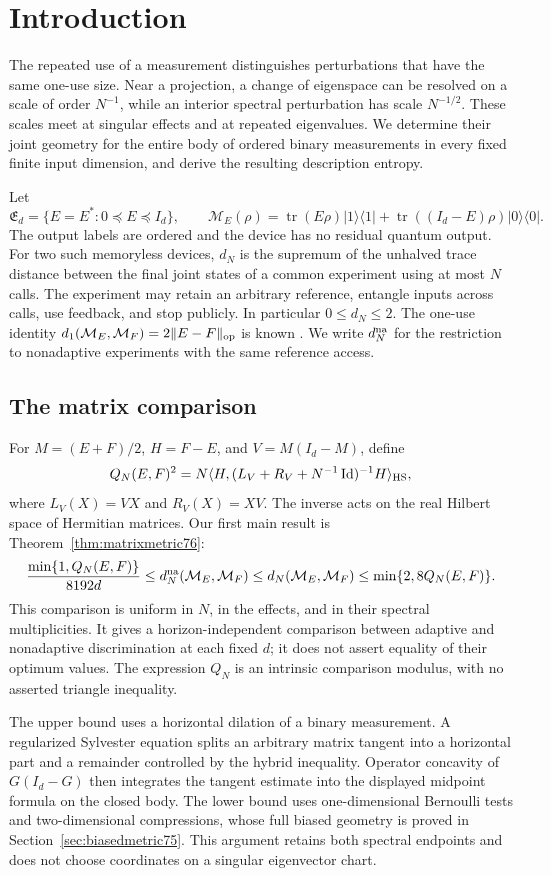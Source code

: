 \section{Introduction}
The repeated use of a measurement distinguishes perturbations that have
the same one-use size. Near a projection, a change of eigenspace can be
resolved on a scale of order $N^{-1}$, while an interior spectral
perturbation has scale $N^{-1/2}$. These scales meet at singular effects
and at repeated eigenvalues. We determine their joint geometry for the
entire body of ordered binary measurements in every fixed finite input
dimension, and derive the resulting description entropy.

Let
\[
 \mathfrak E_d=\{E=E^*:0\preceq E\preceq I_d\},\qquad
 \mathcal M_E(\rho)=\operatorname{tr}(E\rho)|1\rangle\langle1|
       +\operatorname{tr}((I_d-E)\rho)|0\rangle\langle0|.
\]
The output labels are ordered and the device has no residual quantum
output. For two such memoryless devices, $d_N$ is the supremum of the
unhalved trace distance between the final joint states of a common
experiment using at most $N$ calls. The experiment may retain an
arbitrary reference, entangle inputs across calls, use feedback, and
stop publicly. In particular $0\le d_N\le2$. The one-use identity
$d_1(\mathcal M_E,\mathcal M_F)=2\|E-F\|_{\rm op}$ is known
\cite[Lemmas III.7--III.8]{MB67}. We write $d_N^{\rm na}$ for the
restriction to nonadaptive experiments with the same reference access.

\subsection{The matrix comparison}
For $M=(E+F)/2$, $H=F-E$, and $V=M(I_d-M)$, define
\[
 Q_N(E,F)^2
   =N\langle H,(L_V+R_V+N^{-1}\operatorname{Id})^{-1}H
                      \rangle_{\rm HS},
\]
where $L_V(X)=VX$ and $R_V(X)=XV$. The inverse acts on the real
Hilbert space of Hermitian matrices. Our first main result is
Theorem~\ref{thm:matrixmetric76}:
\[
 \frac{\min\{1,Q_N(E,F)\}}{8192d}
 \le d_N^{\rm na}(\mathcal M_E,\mathcal M_F)
 \le d_N(\mathcal M_E,\mathcal M_F)
 \le\min\{2,8Q_N(E,F)\}.
\]
This comparison is uniform in $N$, in the effects, and in their
spectral multiplicities. It gives a horizon-independent comparison
between adaptive and nonadaptive discrimination at each fixed $d$;
it does not assert equality of their optimum values. The expression
$Q_N$ is an intrinsic comparison modulus, with no asserted triangle
inequality.

The upper bound uses a horizontal dilation of a binary measurement.
A regularized Sylvester equation splits an arbitrary matrix tangent
into a horizontal part and a remainder controlled by the hybrid
inequality. Operator concavity of $G(I_d-G)$ then integrates the
tangent estimate into the displayed midpoint formula on the closed
body. The lower bound uses one-dimensional Bernoulli tests and
two-dimensional compressions, whose full biased geometry is proved
in Section~\ref{sec:biasedmetric75}. This argument retains both
spectral endpoints and does not choose coordinates on a singular
eigenvector chart.

